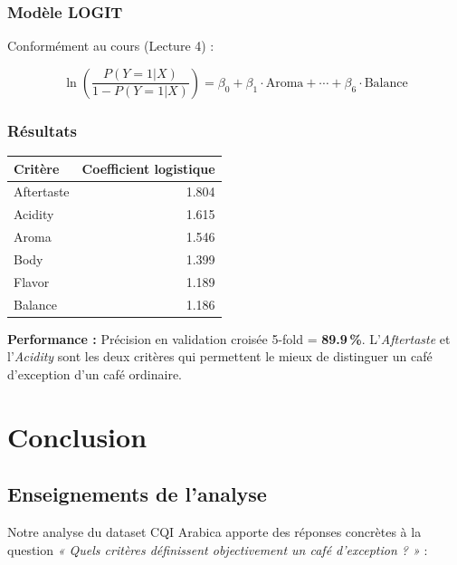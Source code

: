 \documentclass[12pt,a4paper]{article}
\begin{document}
\subsubsection{Modèle LOGIT}

Conformément au cours (Lecture 4) :

\begin{equation}
  \ln\left(\frac{P(Y=1|X)}{1-P(Y=1|X)}\right)
  = \beta_0 + \beta_1 \cdot \text{Aroma} + \cdots + \beta_6 \cdot \text{Balance}
\end{equation}

\subsubsection{Résultats}

\begin{center}
\begin{tabular}{@{}lr@{}}
\toprule
\rowcolor{coffeecream}
\textbf{Critère} & \textbf{Coefficient logistique} \\
\midrule
Aftertaste  & 1.804 \\
Acidity     & 1.615 \\
Aroma       & 1.546 \\
Body        & 1.399 \\
Flavor      & 1.189 \\
Balance     & 1.186 \\
\bottomrule
\end{tabular}
\end{center}

\textbf{Performance :} Précision en validation croisée 5-fold = \textbf{89.9\,\%}.
L'\textit{Aftertaste} et l'\textit{Acidity} sont les deux critères qui permettent le mieux de
distinguer un café d'exception d'un café ordinaire.

\section{Conclusion}

\subsection{Enseignements de l'analyse}

Notre analyse du dataset CQI Arabica apporte des réponses concrètes à la question
\textit{« Quels critères définissent objectivement un café d'exception ? »} :
\end{document}
